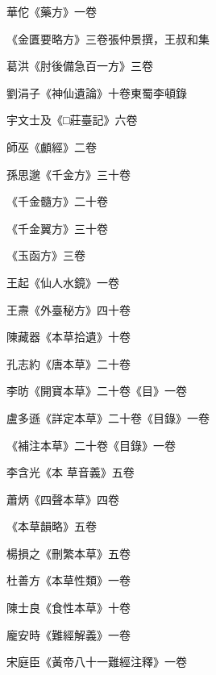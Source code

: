 \begin{pinyinscope}
 華佗《藥方》一卷



 《金匱要略方》三卷張仲景撰，王叔和集



 葛洪《肘後備急百一方》三卷



 劉涓子《神仙遺論》十卷東蜀李頓錄



 宇文士及《□莊臺記》六卷



 師巫《顱經》二卷



 孫思邈《千金方》三十卷



 《千金髓方》二十卷



 《千金翼方》三十卷



 《玉函方》三卷



 王起《仙人水鏡》一卷



 王燾《外臺秘方》四十卷



 陳藏器《本草拾遺》十卷



 孔志約《唐本草》二十卷



 李昉《開寶本草》二十卷《目》一卷



 盧多遜《詳定本草》二十卷《目錄》一卷



 《補注本草》二十卷《目錄》一卷



 李含光《本
 草音義》五卷



 蕭炳《四聲本草》四卷



 《本草韻略》五卷



 楊損之《刪繁本草》五卷



 杜善方《本草性類》一卷



 陳士良《食性本草》十卷



 龐安時《難經解義》一卷



 宋庭臣《黃帝八十一難經注釋》一卷




\end{pinyinscope}

